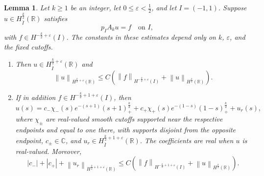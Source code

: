 \documentclass[11pt,reqno]{amsart}
\theoremstyle{plain}
\newtheorem{lemma}[theorem]{Lemma}
\theoremstyle{definition}
\numberwithin{equation}{section}
\newcommand{\paren}[1]{\left(#1\right)}
\newcommand{\norm}[1]{\left\lVert #1 \right\rVert}
\newcommand{\R}{\mathbb{R}}
\begin{document}
\begin{lemma}\label{lem:A-orderk-interval}
Let $k\ge 1$ be an integer, let $0\le \varepsilon<\frac12$, and let
$I=(-1,1)$. Suppose $u\in H^{\frac{k}{2}}_{\overline I}(\R)$ satisfies
\begin{equation}\label{eq:A-orderk-interval}
    p_I A_k u = f \quad \text{on } I,
\end{equation}
with $f\in H^{-\frac{k}{2}+\varepsilon}(I)$.
The constants in these estimates depend only on $k$, $\varepsilon$, and
the fixed cutoffs.
\begin{enumerate}
    \item Then $u\in H^{\frac{k}{2}+\varepsilon}_{\overline I}(\R)$ and
\begin{equation}\label{eq:A-orderk-interval-est}
    \norm{u}_{H^{\frac{k}{2}+\varepsilon}(\R)}
    \le C\paren{
    \norm{f}_{H^{-\frac{k}{2}+\varepsilon}(I)}
    + \norm{u}_{H^{\frac{k}{2}}(\R)}} .
\end{equation}
    \item If in addition $f\in H^{-\frac{k}{2}+1+\varepsilon}(I)$, then
    \begin{equation}\label{eq:A-orderk-interval-split}
        u(s)=c_-\chi_-(s)e^{-(s+1)}(s+1)_+^{\frac{k}{2}}
        +c_+\chi_+(s)e^{-(1-s)}(1-s)_+^{\frac{k}{2}}+u_r(s),
    \end{equation}
    where $\chi_\pm$ are real-valued smooth cutoffs supported near the
    respective endpoints and equal to one there, with supports disjoint
    from the opposite endpoint, $c_\pm\in\mathbb C$, and
    $u_r\in H^{\frac{k}{2}+1+\varepsilon}_{\overline I}(\R)$.
    The coefficients are real when $u$ is real-valued. Moreover,
    \begin{equation}\label{eq:A-orderk-interval-split-est}
        |c_-|+|c_+|+\norm{u_r}_{H^{\frac{k}{2}+1+\varepsilon}(\R)}
        \le C\paren{
        \norm{f}_{H^{-\frac{k}{2}+1+\varepsilon}(I)}
        +\norm{u}_{H^{\frac{k}{2}}(\R)}} .
    \end{equation}
\end{enumerate}
\end{lemma}
\end{document}
